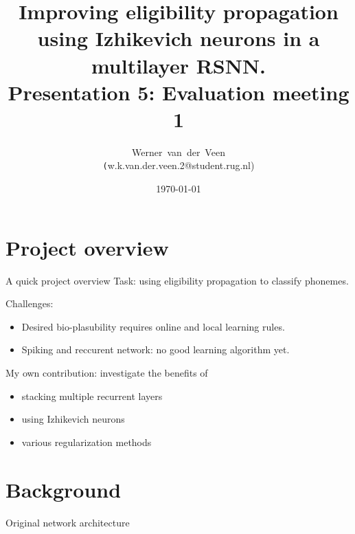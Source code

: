 \documentclass[t]{beamer}
\title[Eligibility propagation]{Improving eligibility propagation using Izhikevich neurons in a multilayer RSNN.\\\vspace{10pt}
\large{Presentation 5: Evaluation meeting 1}}
\author[Werner]{Werner~van~der~Veen\\\footnotesize\texttt({w.k.van.der.veen.2@student.rug.nl})}\date{\today}
\begin{document}
\begin{frame}
    \titlepage
\end{frame}



\small
\section{Project overview}
\begin{frame}{A quick project overview}
	Task: using eligibility propagation to classify phonemes.
	
	Challenges:
	\begin{itemize}[label=--]
		\item Desired bio-plasubility requires online and local learning rules.
		\item Spiking and reccurent network: no good learning algorithm yet.
	\end{itemize}
	
	My own contribution: investigate the benefits of
	\begin{itemize}[label=--]
		\item stacking multiple recurrent layers
		\item using Izhikevich neurons
		\item various regularization methods
	\end{itemize}
		
\end{frame}

\section{Background}
\begin{frame}{Original network architecture}
	\begin{figure}[!ht]
		
	\end{figure}
\end{frame}
\end{document}
